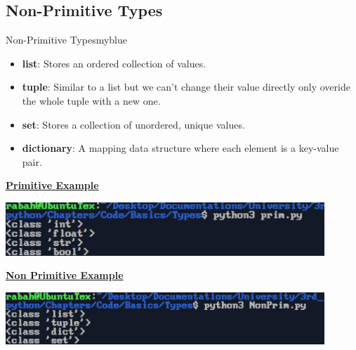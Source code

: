 \vspace{0.25cm}
\subsection{Non-Primitive Types}
\begin{prettyBox}{Non-Primitive Types}{myblue}
\begin{itemize}
    \item \textbf{list}: Stores an ordered collection of values.
    \item \textbf{tuple}: Similar to a list but we can't change their value directly only overide the whole
        tuple with a new one.
    \item \textbf{set}: Stores a collection of unordered, unique values.
    \item \textbf{dictionary}: A mapping data structure where each element is a key-value pair.
\end{itemize}
\end{prettyBox}



\textbf{\underline{Primitive Example}}\\[0.1cm]


\vspace{0.25cm}
\begin{center}
    \includegraphics[width = 0.9\textwidth]{Chapters/ScreenShot/Basics/Types/primOutput.png}
\end{center}

\vspace{1cm}

\textbf{\underline{Non Primitive Example}}\\[0.1cm]


\vspace{0.25cm}
\begin{center}
    \includegraphics[width = 0.9\textwidth]{Chapters/ScreenShot/Basics/Types/NonPrimOutput.png}
\end{center}

